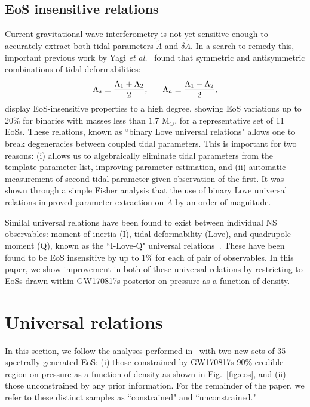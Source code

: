 \documentclass[prd,twocolumn,nofootinbib,superscriptaddress,amsmath,amssymb]{revtex4-1}
\begin{document}
\subsection{EoS insensitive relations}\label{sec:eosInsensitive}
Current gravitational wave interferometry is not yet sensitive enough to accurately extract both tidal parameters $\tilde{\Lambda}$ and $\delta\tilde{\Lambda}$.
In a search to remedy this, important previous work by Yagi \textit{et al.}~\cite{Yagi:binLove} found that symmetric and antisymmetric combinations of tidal deformabilities:
\begin{equation}
\Lambda_s \equiv \frac{\Lambda_1 + \Lambda_2}{2}, \hspace{6mm} \Lambda_a \equiv \frac{\Lambda_1 - \Lambda_2}{2},
\end{equation}
display EoS-insensitive properties to a high degree, showing EoS variations up to 20\% for binaries with masses less than $1.7 \text{ M}_{\odot}$, for a representative set of 11 EoSs. 
These relations, known as ``binary Love universal relations" allows one to break degeneracies between coupled tidal parameters.
This is important for two reasons: (i) allows us to algebraically eliminate tidal parameters from the template parameter list, improving parameter estimation, and (ii) automatic measurement of second tidal parameter given observation of the first.
It was shown through a simple Fisher analysis that the use of binary Love universal relations improved parameter extraction on $\tilde{\Lambda}$ by an order of magnitude.

Similal universal relations have been found to exist between individual NS observables: moment of inertia (I), tidal deformability (Love), and quadrupole moment (Q), known as the ``I-Love-Q" universal relations~\cite{Yagi:ILQ}.
These have been found to be EoS insensitive by up to 1\% for each of pair of observables.
In this paper, we show improvement in both of these universal relations by restricting to EoSs drawn within GW170817s posterior on pressure as a function of density.
\section{Universal relations}\label{sec:universal}
In this section, we follow the analyses performed in~\cite{Yagi:binLove,Yagi:ILQ} with two new sets of 35 spectrally generated EoS: (i) those constrained by GW170817s 90\% credible region on pressure as a function of density as shown in Fig.~\ref{fig:eos}, and (ii) those unconstrained by any prior information.
For the remainder of the paper, we refer to these distinct samples as ``constrained" and ``unconstrained." 
\end{document}
